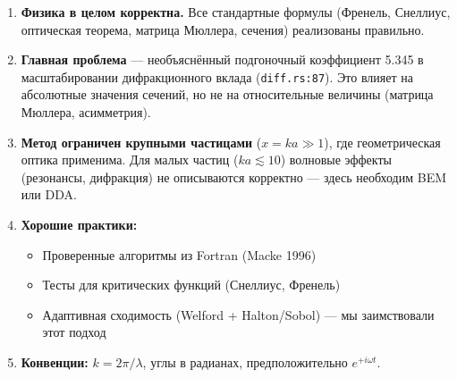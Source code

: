 \documentclass[12pt,a4paper]{article}
\begin{document}
\begin{enumerate}
  \item \textbf{Физика в целом корректна.} Все стандартные формулы (Френель, Снеллиус,
        оптическая теорема, матрица Мюллера, сечения) реализованы правильно.

  \item \textbf{Главная проблема} --- необъяснённый подгоночный коэффициент 5.345 в
        масштабировании дифракционного вклада (\texttt{diff.rs:87}).
        Это влияет на абсолютные значения сечений, но не на относительные
        величины (матрица Мюллера, асимметрия).

  \item \textbf{Метод ограничен крупными частицами} ($x = ka \gg 1$), где
        геометрическая оптика применима. Для малых частиц ($ka \lesssim 10$)
        волновые эффекты (резонансы, дифракция) не описываются корректно ---
        здесь необходим BEM или DDA.

  \item \textbf{Хорошие практики:}
  \begin{itemize}[nosep]
    \item Проверенные алгоритмы из Fortran (Macke 1996)
    \item Тесты для критических функций (Снеллиус, Френель)
    \item Адаптивная сходимость (Welford + Halton/Sobol) --- мы заимствовали этот подход
  \end{itemize}

  \item \textbf{Конвенции:} $k = 2\pi/\lambda$, углы в радианах, предположительно $e^{+i\omega t}$.
\end{enumerate}
\end{document}
